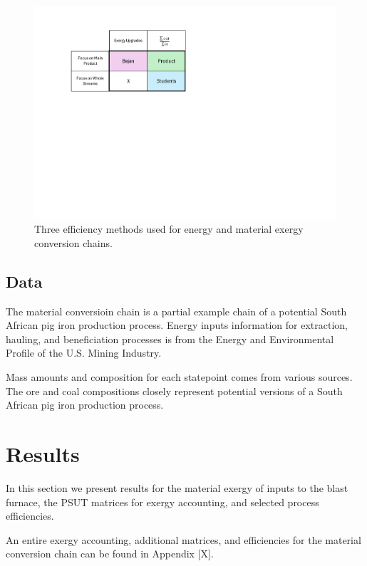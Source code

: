 \documentclass[energies,article,submit,pdftex,moreauthors]{Definitions/mdpi}
\begin{document}
\begin{figure}
  \centering
  \includegraphics[width=0.8\linewidth]{images/efficiency_methods.pdf}
  \caption{Three efficiency methods used for energy and material exergy conversion chains.}
  \label{fig:efficiencymethods}
\end{figure}





\subsection{Data}
\label{ssec: data}

The material conversioin chain is a partial example chain
of a potential South African pig iron production process.
Energy inputs information
for extraction, hauling, and beneficiation processes
is from the Energy and Environmental Profile of the U.S. Mining Industry.

Mass amounts and composition
for each statepoint
comes from various sources.
The ore and coal compositions closely represent potential versions
of a South African pig iron production process.


\section{Results}
\label{sec:results}

In this section we present results
for the material exergy
of inputs to the blast furnace,
the PSUT matrices for exergy accounting,
and selected process efficiencies.

An entire exergy accounting,
additional matrices,
and efficiencies
for the material conversion chain
can be found in Appendix [X].
\end{document}
